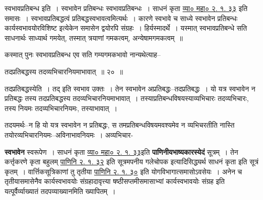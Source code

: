 \documentclass[article,12pt,a4paper]{memoir}
\begin{document}
	  \pstart स्वभावप्रतिबन्ध इति । स्वभावेन प्रतिबन्धः स्वभावप्रतिबन्धः । साधनं कृता \href{http://sarit.indology.info/?cref=vk-mbh.2.1.33}{व्या०
	महा० २. १. ३३} इति समासः । स्वभावप्रतिबद्धत्वं प्रतिबद्धस्वभावत्वमित्यर्थः । कारणे स्वभावे च साध्ये स्वभावेन प्रतिबन्धः कार्यस्वभावयोरविशिष्ट इत्येकेन समासेन द्वयोरपि संग्रहः । हिर्यस्मादर्थे । यस्मात् स्वभावप्रतिबन्धे सति साधनार्थः साध्यार्थ गमयेत्, तस्मात् त्रयाणां गमकत्वम्, अन्येषामगमकत्वम् ॥
	\pend
        

	  \pstart कस्मात् पुनः स्वभावप्रतिबन्ध एव सति गम्यगमकभावो नान्यथेत्याह--
	\pend
        
	  \bigskip
	  \begingroup
	

	  \pstart तदप्रतिबद्धस्य तदव्यभिचारनियमाभावात् ॥ २० ॥
	\pend
      
	  \endgroup
	 

	  \pstart तदप्रतिबद्धस्येति । तद् इति स्वभाव उक्तः । तेन स्वभावेन अप्रतिबद्धः--तदप्रतिबद्धः । यो यत्र स्वभावेन न प्रतिबद्धः तस्य तदप्रतिबद्धस्य तदव्यभिचारनियमाभावात् । तस्याप्रतिबन्धविषयस्याव्यभिचारः तदव्यभिचारः, तस्य नियमः तदव्यभिचारनियमः, तस्याभावात् ।
	\pend
        

	  \pstart {}तदयमर्थः--न हि यो यत्र स्वभावेन न प्रतिबद्धः, स तमप्रतिबन्धविषयमवश्यमेव न व्यभिचरतीति नास्ति तयोरव्यभिचारनियमः--अविनाभावनियमः । अव्यभिचार-
	\pend
      
	  \endgroup
	

	  \pstart \textbf{स्वभावेन} स्वरूपेण । साधनं कृता \href{http://sarit.indology.info/?cref=vk-mbh.2.1.33}{व्या० महा० २. १. ३३}इति \textbf{पाणिनीयभाष्यकारस्येदं} सूत्रम् । तेन कर्त्तृकरणे कृता बहुलम् \href{http://sarit.indology.info/?cref=Pā.2.1.32}{पाणिनि २. १. ३२} इति सूत्रमपनीय गलेचोपक इत्यादिसिद्ध्यर्थ साधनं कृता इति सूत्रं कृतम् । वार्त्तिकसूत्रिकाणां तु तृतीया \href{http://sarit.indology.info/?cref=Pā.2.1.30}{पाणिनि
	२. १. ३०} इति योगविभागात्समासोऽवसेयः । अनेन च तृतीयासमासेनैव कार्यस्वभावयोः संग्रहादावृत्त्या षष्ठीसप्तमीसमासाभ्यां कार्यस्वभावयोः संग्रह इति यत्पूर्वैर्व्याख्यातं तदपव्याख्यानमिति ख्यापितम् ।
	\pend
      
\end{document}
